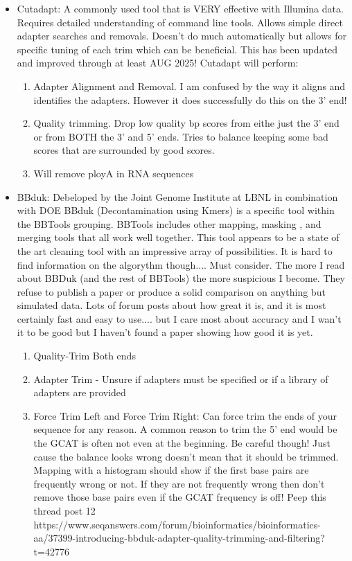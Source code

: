 \documentclass{article}
\begin{document}
\begin{itemize}
\begin{itemize}
\begin{enumerate}
                    \end{enumerate}
            \end{itemize}
        \item Cutadapt: \cite{martinAlgorithmsToolsAnalysis2014} A commonly used tool that is VERY effective with Illumina data.  Requires detailed understanding of command line tools.  Allows simple direct adapter searches and removals.  Doesn't do much automatically but allows for specific tuning of each trim which can be beneficial.  This has been updated and improved through at least AUG 2025! Cutadapt will perform:
            \begin{enumerate}
                \item Adapter Alignment and Removal.  I am confused by the way it aligns and identifies the adapters.  However it does successfully do this on the 3' end!
                \item Quality trimming.  Drop low quality bp scores from eithe just the 3' end or from BOTH the 3' and 5' ends.   Tries to balance keeping some bad scores that are surrounded by good scores.   
                \item Will remove ployA in RNA sequences
            \end{enumerate}
        \item BBduk: \cite{BBDukGuide} Debeloped by the Joint Genome Institute at LBNL in combination with DOE BBduk (Decontamination using Kmers) is a specific tool within the BBTools grouping.   BBTools includes other mapping, masking , and merging tools that all work well together.   This tool appears to be a state of the art cleaning tool with an impressive array of possibilities.  It is hard to find information on the algorythm though.... Must consider.   The more I read about BBDuk (and the rest of BBTools) the more suspicious I become.   They refuse to publish a paper or produce a solid comparison on anything but simulated data.  Lots of forum posts about how great it is, and it is most certainly fast and easy to use.... but I care most about accuracy and I wan't it to be good but I haven't found a paper showing how good it is yet.
            \begin{enumerate}
                \item Quality-Trim Both ends
                \item Adapter Trim - Unsure if adapters must be specified or if a library of adapters are provided
                \item Force Trim Left and Force Trim Right:  Can force trim the ends of your sequence for any reason.  A common reason to trim the 5' end would be the GCAT is often not even at the beginning.  Be careful though!  Just cause the balance looks wrong doesn't mean that it should be trimmed.   Mapping with a histogram should show if the first base pairs are frequently wrong or not.   If they are not frequently wrong then don't remove those base pairs even if the GCAT frequency is off!   Peep this thread post 12 https://www.seqanswers.com/forum/bioinformatics/bioinformatics-aa/37399-introducing-bbduk-adapter-quality-trimming-and-filtering?t=42776

\end{enumerate}
\end{itemize}
\end{document}
